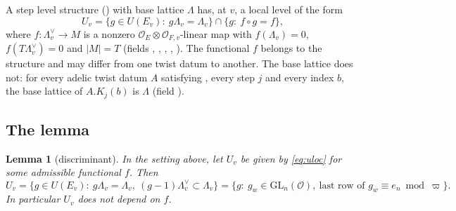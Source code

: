 \documentclass[11pt]{article}
\newcommand{\OEr}{\mathcal O_E}
\newcommand{\Ok}{\mathcal O}
\newcommand{\GL}{\mathrm{GL}}
\newcommand{\Lb}{\Lambda}
\newcommand{\Lbd}{\Lambda^{\vee}}
\newtheorem{lemma}[theorem]{Lemma}
\theoremstyle{definition}
\theoremstyle{remark}
\begin{document}
A step level structure () with base lattice $\Lb$ has, at $v$, a local level of the form
\begin{equation}\label{eq:uloc}
U_v=\{g\in U(E_v):\ g\Lb_v=\Lb_v\}\cap\{g:\ f\circ g=f\},
\end{equation}
where $f\colon\Lbd_v\to M$ is a nonzero $\OEr\otimes\Ok_{F,v}$-linear map with $f(\Lb_v)=0$, $f(T\Lbd_v)=0$ and $|M|=T$ (fields , , , , ). The functional $f$ belongs to the structure and may differ from one twist datum to another. The base lattice does not: for every adelic twist datum $A$ satisfying , every step $j$ and every index $b$, the base lattice of $A.K_j(b)$ is $\Lb$ (field ).

\subsection{The lemma}

\begin{lemma}[discriminant]\label{lem:disc}
In the setting above, let $U_v$ be given by \eqref{eq:uloc} for some admissible functional $f$. Then
\[
U_v=\{g\in U(E_v):\ g\Lb_v=\Lb_v,\ (g-1)\Lbd_v\subset\Lb_v\}=\{g:\ g_w\in\GL_n(\Ok),\ \text{last row of }g_w\equiv e_n\bmod\varpi\}.
\]
In particular $U_v$ does not depend on $f$.
\end{lemma}
\end{document}
